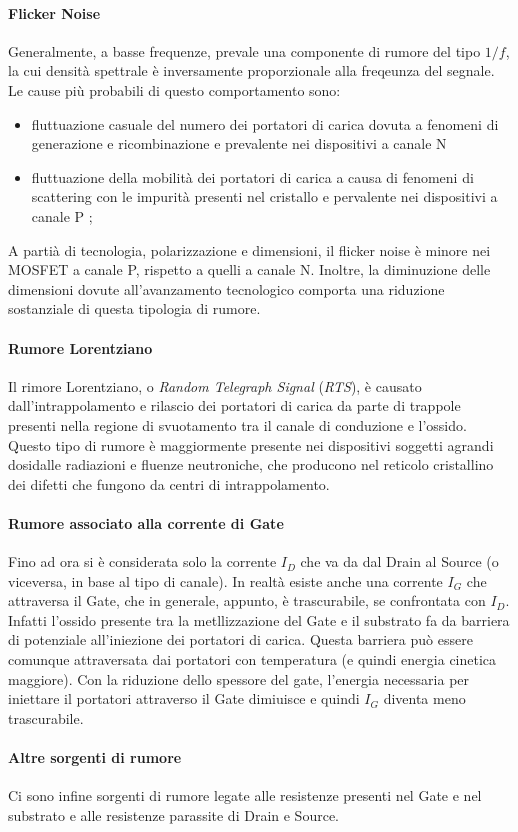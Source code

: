 \paragraph*{Flicker Noise}
Generalmente, a basse frequenze, prevale una componente di rumore del tipo $1/f$, la cui densità spettrale è inversamente proporzionale alla freqeunza del segnale. Le cause più probabili di questo comportamento sono: 
\begin{itemize}
  \item fluttuazione casuale del numero dei portatori di carica dovuta a fenomeni di generazione e ricombinazione e prevalente nei dispositivi a canale N
  \item fluttuazione della mobilità dei portatori di carica a causa di fenomeni di scattering con le impurità presenti nel cristallo e pervalente nei dispositivi a canale P ;
\end{itemize}

A partià di tecnologia, polarizzazione e dimensioni, il flicker noise è minore nei MOSFET a canale P, rispetto a quelli a canale N. Inoltre, la diminuzione delle dimensioni dovute all'avanzamento tecnologico comporta una riduzione sostanziale di questa tipologia di rumore.

\paragraph*{Rumore Lorentziano}
Il rimore Lorentziano, o \emph{Random Telegraph Signal} (\emph{RTS}), è causato dall'intrappolamento e rilascio dei portatori di carica da parte di trappole presenti nella regione di svuotamento tra il canale di conduzione e l'ossido. Questo tipo di rumore è maggiormente presente nei dispositivi soggetti agrandi dosidalle radiazioni e fluenze neutroniche, che producono nel reticolo cristallino dei difetti che fungono da centri di intrappolamento.

\paragraph*{Rumore associato alla corrente di Gate}
Fino ad ora si è considerata solo la corrente $I_D$ che va da dal Drain al Source (o viceversa, in base al tipo di canale). In realtà esiste anche una corrente $I_G$ che attraversa il Gate, che in generale, appunto, è trascurabile, se confrontata con  $I_D$. Infatti l'ossido presente tra la metllizzazione del Gate e il substrato fa da barriera di potenziale all'iniezione dei portatori di carica. Questa barriera può essere comunque attraversata dai portatori con temperatura (e quindi energia cinetica maggiore). Con la riduzione dello spessore del gate, l'energia necessaria per iniettare il portatori attraverso il Gate dimiuisce e quindi $I_G$ diventa meno trascurabile.

\paragraph*{Altre sorgenti di rumore}
Ci sono infine sorgenti di rumore legate alle resistenze presenti nel Gate e nel substrato e alle resistenze parassite di Drain e Source.


















